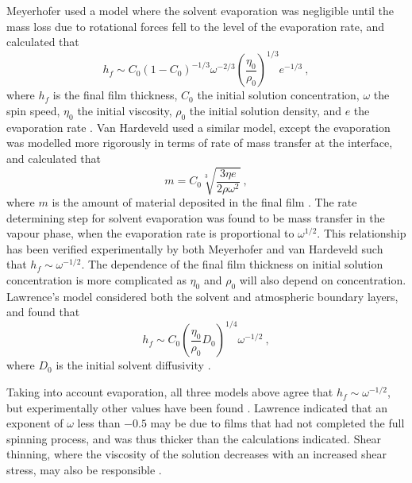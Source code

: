 Meyerhofer used a model where the solvent evaporation was negligible until the mass loss due to rotational forces fell to the level of the evaporation rate, and calculated that
\begin{equation}
h_f \sim C_0(1-C_0)^{-1/3} \omega^{-2/3} \left( \frac{\eta_0}{\rho_0} \right)^{1/3} e^{-1/3} ~,
\label{Meyehofer}
\end{equation}
where $h_f$ is the final film thickness, $C_0$ the initial solution concentration, $\omega$ the spin speed, $\eta_0$ the initial viscosity, $\rho_0$ the initial solution density, and $e$ the evaporation rate \cite{Meyerhofer1978}. Van Hardeveld used a similar model, except the evaporation was modelled more rigorously in terms of rate of mass transfer at the interface, and calculated that
\begin{equation}
m = C_0 \sqrt[3]{\frac{3 \eta e}{2 \rho {\omega}^2}} ~,
\label{Hardeveld}
\end{equation}
where $m$ is the amount of material deposited in the final film \cite{VanHardeveld1995}. The rate determining step for solvent evaporation was found to be mass transfer in the vapour phase, when the evaporation rate is proportional to ${\omega}^{1/2}$. This relationship has been verified experimentally by both Meyerhofer and van Hardeveld \cite{Meyerhofer1978, VanHardeveld1995} such that $h_f \sim \omega^{-1/2}$. The dependence of the final film thickness on initial solution concentration is more complicated as $\eta_0$ and $\rho_0$ will also depend on concentration. Lawrence's model considered both the solvent and atmospheric boundary layers, and found that
\begin{equation}
h_f \sim C_0 \left(\frac{\eta_0}{\rho_0} D_0 \right)^{1/4} \omega^{-1/2} ~,
\label{Lawrence}
\end{equation}
where $D_0$ is the initial solvent diffusivity \cite{Lawrence1988}.

Taking into account evaporation, all three models above agree that $h_f \sim \omega^{-1/2}$, but experimentally other values have been found \cite{Lawrence1988}. Lawrence indicated that an exponent of $\omega$ less than $-0.5$ may be due to films that had not completed the full spinning process, and was thus thicker than the calculations indicated. Shear thinning, where the viscosity of the solution decreases with an increased shear stress, may also be responsible \cite{Lawrence1988}.

